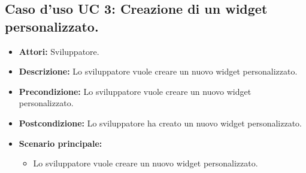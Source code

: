 \subsection{Caso d'uso UC 3: Creazione di un widget personalizzato.}
\label{Caso d'uso UC 3: Creazione di un widget personalizzato.}

\FloatBarrier
\begin{itemize}
\item \textbf{Attori:} Sviluppatore.
\item \textbf{Descrizione:} Lo sviluppatore vuole creare un nuovo widget personalizzato.
\item \textbf{Precondizione:} Lo sviluppatore vuole creare un nuovo widget personalizzato. 
\item \textbf{Postcondizione:} Lo sviluppatore ha creato un nuovo widget personalizzato.
\item \textbf{Scenario principale:}
	\begin{itemize}
	\item{Lo sviluppatore vuole creare un nuovo widget personalizzato.}
	\end{itemize}
\end{itemize}